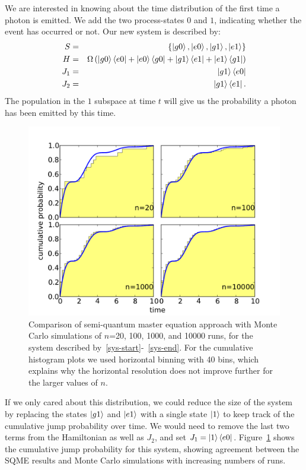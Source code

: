 We are interested in knowing about the time distribution of the first time a photon is emitted. We add the two process-states $0$ and $1$, indicating whether the event has occurred or not. Our new system is described by:
\begin{eqnarray}
  S &=& \left\{ \left\vert g0\right\rangle, \left\vert e0\right\rangle, \left\vert g1\right\rangle, \left\vert e1\right\rangle \right\} \label{sys-start} \\
  H &=& \Omega \left( \left\vert g0 \right\rangle \left\langle e0 \right\vert + \left\vert e0 \right\rangle \left\langle g0 \right\vert + \left\vert g1 \right\rangle \left\langle e1 \right\vert + \left\vert e1 \right\rangle \left\langle g1 \right\vert  \right) \\
  J_1 &=&  \left\vert g1 \right\rangle \left\langle e0 \right\vert \\
  J_2 &=& \left\vert g1 \right\rangle \left\langle e1 \right\vert. \label{sys-end}
\end{eqnarray}
The population in the $1$ subspace at time $t$ will give us the probability a photon has been emitted by this time.

\begin{figure}[htb]
  \begin{center}
    \includegraphics[width=12cm]{assets/sqme_mc_comp.pdf}
  \end{center}
  \caption{Comparison of semi-quantum master equation approach with Monte Carlo simulations of $n$=20, 100, 1000, and 10000 runs, for the system described by~\ref{sys-start}-~\ref{sys-end}. For the cumulative histogram plots we used horizontal binning with 40 bins, which explains why the horizontal resolution does not improve further for the larger values of $n$.}
  \label{sqme_mc_comp}
\end{figure}

If we only cared about this distribution, we could reduce the size of the system by replacing the states $\left\vert g1\right\rangle$ and $\left\vert e1\right\rangle$ with a single state $\left\vert1\right\rangle$ to keep track of the cumulative jump probability over time. We would need to remove the last two terms from the Hamiltonian as well as $J_2$, and set $J_1 =  \left\vert 1 \right\rangle \left\langle e0 \right\vert$. Figure~\ref{sqme_mc_comp} shows the cumulative jump probability for this system, showing agreement between the SQME results and Monte Carlo simulations with increasing numbers of runs.


